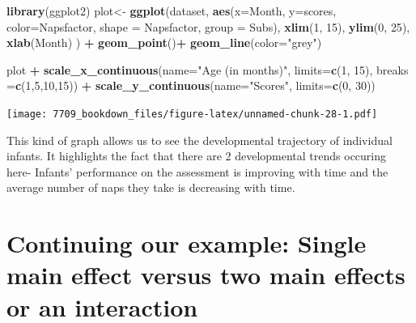 \documentclass[]{book}
\newenvironment{Shaded}{\begin{snugshade}}{\end{snugshade}}
\newcommand{\DataTypeTok}[1]{\textcolor[rgb]{0.13,0.29,0.53}{#1}}
\newcommand{\DecValTok}[1]{\textcolor[rgb]{0.00,0.00,0.81}{#1}}
\newcommand{\KeywordTok}[1]{\textcolor[rgb]{0.13,0.29,0.53}{\textbf{#1}}}
\newcommand{\NormalTok}[1]{#1}
\newcommand{\OperatorTok}[1]{\textcolor[rgb]{0.81,0.36,0.00}{\textbf{#1}}}
\newcommand{\StringTok}[1]{\textcolor[rgb]{0.31,0.60,0.02}{#1}}
\begin{document}
\begin{Shaded}
\begin{Highlighting}[]
\KeywordTok{library}\NormalTok{(ggplot2)}
\NormalTok{plot<-}\StringTok{ }\KeywordTok{ggplot}\NormalTok{(dataset, }\KeywordTok{aes}\NormalTok{(}\DataTypeTok{x=}\NormalTok{Month, }\DataTypeTok{y=}\NormalTok{scores,  }\DataTypeTok{color=}\NormalTok{Napsfactor, }\DataTypeTok{shape =}\NormalTok{ Napsfactor, }\DataTypeTok{group =}\NormalTok{ Subs), }\KeywordTok{xlim}\NormalTok{(}\DecValTok{1}\NormalTok{, }\DecValTok{15}\NormalTok{), }\KeywordTok{ylim}\NormalTok{(}\DecValTok{0}\NormalTok{, }\DecValTok{25}\NormalTok{), }\KeywordTok{xlab}\NormalTok{(Month) ) }\OperatorTok{+}\StringTok{ }
\StringTok{  }\KeywordTok{geom_point}\NormalTok{()}\OperatorTok{+}
\StringTok{  }\KeywordTok{geom_line}\NormalTok{(}\DataTypeTok{color=}\StringTok{"grey"}\NormalTok{)}

\NormalTok{plot }\OperatorTok{+}\StringTok{ }\KeywordTok{scale_x_continuous}\NormalTok{(}\DataTypeTok{name=}\StringTok{"Age (in months)"}\NormalTok{, }\DataTypeTok{limits=}\KeywordTok{c}\NormalTok{(}\DecValTok{1}\NormalTok{, }\DecValTok{15}\NormalTok{), }\DataTypeTok{breaks =}\KeywordTok{c}\NormalTok{(}\DecValTok{1}\NormalTok{,}\DecValTok{5}\NormalTok{,}\DecValTok{10}\NormalTok{,}\DecValTok{15}\NormalTok{)) }\OperatorTok{+}
\StringTok{  }\KeywordTok{scale_y_continuous}\NormalTok{(}\DataTypeTok{name=}\StringTok{"Scores"}\NormalTok{, }\DataTypeTok{limits=}\KeywordTok{c}\NormalTok{(}\DecValTok{0}\NormalTok{, }\DecValTok{30}\NormalTok{))}
\end{Highlighting}
\end{Shaded}

\texttt{[image: 7709\_bookdown\_files/figure-latex/unnamed-chunk-28-1.pdf]}

This kind of graph allows us to see the developmental trajectory of individual infants. It highlights the fact that there are 2 developmental trends occuring here- Infants' performance on the assessment is improving with time and the average number of naps they take is decreasing with time.

\hypertarget{continuing-our-example-single-main-effect-versus-two-main-effects-or-an-interaction}{%
\section{Continuing our example: Single main effect versus two main effects or an interaction}\label{continuing-our-example-single-main-effect-versus-two-main-effects-or-an-interaction}}
\end{document}
